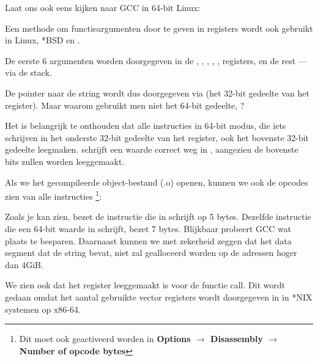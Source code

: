 
Laat ons ook eens kijken naar GCC in 64-bit Linux:



Een methode om functieargumenten door te geven in registers wordt ook gebruikt in Linux, *BSD en \MacOSX \SysVABI.

De eerste 6 argumenten worden doorgegeven in de \RDI, \RSI, \RDX, \RCX, ,  registers, en de rest --- via de stack.

De pointer naar de string wordt dus doorgegeven via \EDI (het 32-bit gedeelte van het register).
Maar waarom gebruikt men niet het 64-bit gedeelte, \RDI?

Het is belangrijk te onthouden dat alle \MOV instructies in 64-bit modus, die iets schrijven in het onderste 32-bit gedeelte van het register, ook het bovenste 32-bit gedeelte leegmaken.
 schrijft een waarde correct weg in \RAX, aangezien de bovenste bits zullen worden leeggemaakt.

Als we het gecompileerde object-bestand (.o) openen, kunnen we ook de opcodes zien van alle instructies
\footnote{Dit moet ook geactiveerd worden in \textbf{Options $\rightarrow$ Disassembly $\rightarrow$ Number of opcode bytes}}:



\label{hw_EDI_instead_of_RDI}
Zoals je kan zien, bezet de instructie die in \EDI schrijft op  5 bytes.
Dezelfde instructie die een 64-bit waarde in \RDI schrijft, bezet 7 bytes.
Blijkbaar probeert GCC wat plaats te besparen.
Daarnaast kunnen we met zekerheid zeggen dat het data segment dat de string bevat, niet zal gealloceerd worden op de adressen hoger dan 4\gls{GiB}.

\label{SysVABI_input_EAX}
We zien ook dat het \EAX register leeggemaakt is voor de \printf functie call.
Dit wordt gedaan omdat het aantal gebruikte vector registers wordt doorgegeven in \EAX in *NIX systemen op x86-64.

